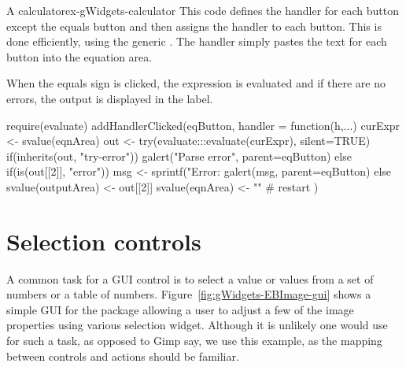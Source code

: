 \begin{example}{A calculator}{ex-gWidgets-calculator}
This code defines the handler for each button except the equals button
and then assigns the handler to each button. This is done efficiently,
using the generic . The handler simply pastes
the text for each button into the equation area.

\begin{Schunk}
\end{Schunk}

When the equals sign is clicked, the expression is evaluated and if
there are no errors, the output is displayed in the label.
\begin{Schunk}
\begin{Sinput}
 require(evaluate)
 addHandlerClicked(eqButton, handler = function(h,...) {
   curExpr <- svalue(eqnArea)
   out <- try(evaluate:::evaluate(curExpr), silent=TRUE)
   if(inherits(out, "try-error")) {
     galert("Parse error", parent=eqButton)
   } else if(is(out[[2]], "error")) {
     msg <- sprintf("Error: %
     galert(msg, parent=eqButton)
   } else {
     svalue(outputArea) <- out[[2]]
     svalue(eqnArea) <- ""            # restart
   }
 })
                   
\end{Sinput}
\end{Schunk}

\end{example}

\section{Selection controls}
\label{sec:gWidgets-widg-select-data}

A common task for a GUI control is to select a value or values from a
set of numbers or a table of
numbers. Figure~\ref{fig:gWidgets-EBImage-gui} shows a simple GUI for
the  package allowing a user to adjust a few of the image
properties using various selection widget. Although it is unlikely one
would use \R{} for such a task, as opposed to Gimp say, we use this
example, as the mapping between controls and actions should be
familiar.

